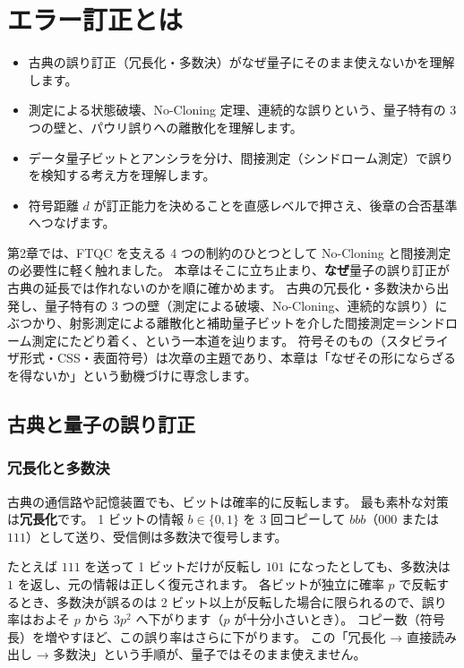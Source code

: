 \chapter{エラー訂正とは}\label{ch:qec_intro}

\begin{chaptergoal}
  \begin{itemize}
  \item 古典の誤り訂正（冗長化・多数決）がなぜ量子にそのまま使えないかを理解します。
  \item 測定による状態破壊、No-Cloning 定理、連続的な誤りという、量子特有の 3 つの壁と、パウリ誤りへの離散化を理解します。
  \item データ量子ビットとアンシラを分け、間接測定（シンドローム測定）で誤りを検知する考え方を理解します。
  \item 符号距離 $d$ が訂正能力を決めることを直感レベルで押さえ、後章の合否基準へつなげます。
  \end{itemize}
\end{chaptergoal}

第2章では、FTQC を支える 4 つの制約のひとつとして No-Cloning と間接測定の必要性に軽く触れました。
本章はそこに立ち止まり、\textbf{なぜ}量子の誤り訂正が古典の延長では作れないのかを順に確かめます。
古典の冗長化・多数決から出発し、量子特有の 3 つの壁（測定による破壊、No-Cloning、連続的な誤り）にぶつかり、射影測定による離散化と補助量子ビットを介した間接測定＝シンドローム測定にたどり着く、という一本道を辿ります。
符号そのもの（スタビライザ形式・CSS・表面符号）は次章の主題であり、本章は「なぜその形にならざるを得ないか」という動機づけに専念します。

\section{古典と量子の誤り訂正}\label{sec:classical_vs_quantum}

\subsection{冗長化と多数決}

古典の通信路や記憶装置でも、ビットは確率的に反転します。
最も素朴な対策は\textbf{冗長化}です。
1 ビットの情報 $b\in\{0,1\}$ を 3 回コピーして $bbb$（$000$ または $111$）として送り、受信側は多数決で復号します。

たとえば $111$ を送って 1 ビットだけが反転し $101$ になったとしても、多数決は $1$ を返し、元の情報は正しく復元されます。
各ビットが独立に確率 $p$ で反転するとき、多数決が誤るのは 2 ビット以上が反転した場合に限られるので、誤り率はおよそ $p$ から $3p^2$ へ下がります（$p$ が十分小さいとき）。
コピー数（符号長）を増やすほど、この誤り率はさらに下がります。
この「冗長化 → 直接読み出し → 多数決」という手順が、量子ではそのまま使えません。

